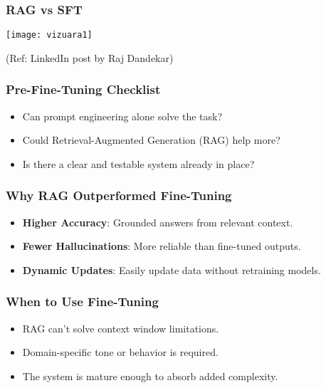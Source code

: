 \begin{frame}[fragile]\frametitle{RAG vs SFT}
	
	\begin{center}
	\texttt{[image: vizuara1]}
	\end{center}
	
{\tiny (Ref: LinkedIn post by Raj Dandekar)}

\end{frame}


\begin{frame}[fragile]\frametitle{Pre-Fine-Tuning Checklist}
    \begin{itemize}
        \item Can prompt engineering alone solve the task?
        \item Could Retrieval-Augmented Generation (RAG) help more?
        \item Is there a clear and testable system already in place?
    \end{itemize}
\end{frame}

\begin{frame}[fragile]\frametitle{Why RAG Outperformed Fine-Tuning}
    \begin{itemize}
        \item \textbf{Higher Accuracy}: Grounded answers from relevant context.
        \item \textbf{Fewer Hallucinations}: More reliable than fine-tuned outputs.
        \item \textbf{Dynamic Updates}: Easily update data without retraining models.
    \end{itemize}
\end{frame}

\begin{frame}[fragile]\frametitle{When to Use Fine-Tuning}
    \begin{itemize}
        \item RAG can't solve context window limitations.
        \item Domain-specific tone or behavior is required.
        \item The system is mature enough to absorb added complexity.
    \end{itemize}
\end{frame}

